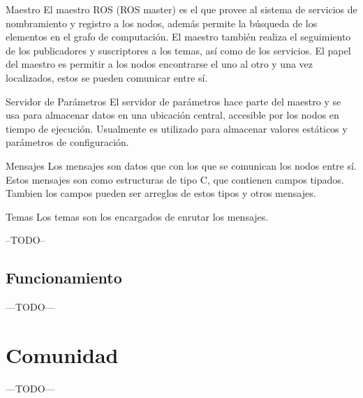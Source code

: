Maestro
El maestro ROS (ROS master) es el que provee al sistema de servicios de nombramiento  y registro a los nodos, además permite la búsqueda de los elementos en el grafo de computación. El maestro también realiza el seguimiento de los publicadores y suscriptores a los temas, así como de los servicios. El papel del maestro es permitir a los nodos encontrarse el uno al otro y una vez localizados, estos se pueden comunicar entre sí.

Servidor de Parámetros
El servidor de parámetros hace parte del maestro y se usa para almacenar datos en una ubicación central, accesible por los nodos en tiempo de ejecución. Usualmente es utilizado para almacenar valores estáticos y parámetros de configuración.

Mensajes
Los mensajes son datos que con los que se comunican los nodos entre sí. Estos mensajes son como estructuras de tipo C, que contienen campos tipados. Tambien los campos pueden ser arreglos de estos tipos y otros mensajes.

Temas
Los temas son los encargados de enrutar los mensajes.

--TODO--

\subsection{Funcionamiento}
---TODO---
\section{Comunidad}
---TODO---